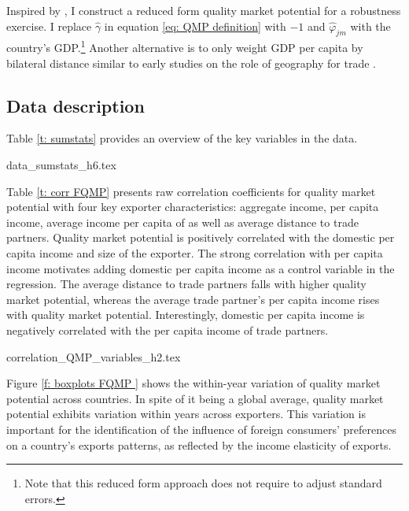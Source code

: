 \documentclass[12pt,a4paper,oneside,times]{article}   	%
\newcommand{\tablespath}{{"C:/Users/dhill/Dropbox/Dissertation"}}
\begin{document}
Inspired by \cite{Dingel2017}, I construct a reduced form quality market potential for a robustness exercise. I replace $\hat{\gamma}$ in equation  \eqref{eq: QMP definition} with $-1$ and $\hat{\varphi}_{jm}$ with the country's GDP.\footnote{Note that this reduced form approach does not require to adjust standard errors.} Another alternative is to only weight GDP per capita by bilateral distance similar to early studies on the role of geography for trade \citep{Davis2003}.

 


\subsection{Data description}
Table \ref{t: sumstats} provides an overview of the key variables in the data.

\begin{table}[htbp]\centering
{data_sumstats_h6.tex}
\end{table} 

Table \ref{t: corr FQMP} presents raw correlation coefficients for quality market potential with four key exporter characteristics: aggregate income, per capita income, average income per capita of as well as average distance to trade partners. Quality market potential is positively correlated with the domestic per capita income and size of the exporter. The strong correlation with per capita income motivates adding domestic per capita income as a control variable in the regression. The average distance to trade partners falls with higher quality market potential, whereas the average trade partner's per capita income rises with quality market potential. Interestingly, domestic per capita income is negatively correlated with the per capita income of trade partners.  


\begin{table}[htbp]\centering
{correlation_QMP_variables_h2.tex}
\end{table}

Figure \ref{f: boxplots FQMP } shows the within-year variation of quality market potential across countries. In spite of it being a global average, quality market potential exhibits variation within years across exporters. This variation is important for the identification of the influence of foreign consumers' preferences on a country's exports patterns, as reflected by the income elasticity of exports. 
\end{document}
